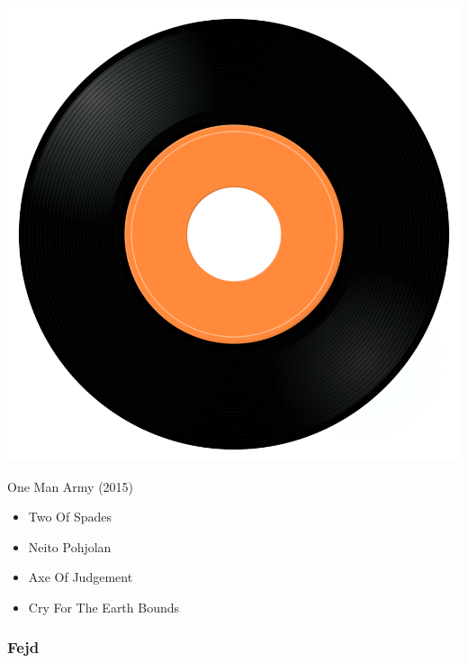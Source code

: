 \begin{minipage}[t]{0.25\textwidth}
\captionsetup{type=figure}
\includegraphics[width=\textwidth]{Images/cover.png}
\caption*{One Man Army (2015)}
\end{minipage}
\begin{minipage}[t]{0.25\textwidth}\vspace{0pt}
\begin{itemize}[nosep,leftmargin=1em,labelwidth=*,align=left]
	\setlength{\itemsep}{0pt}
	\item Two Of Spades
	\item Neito Pohjolan
	\item Axe Of Judgement
	\item Cry For The Earth Bounds
\end{itemize}
\end{minipage}

\subsubsection{Fejd}


